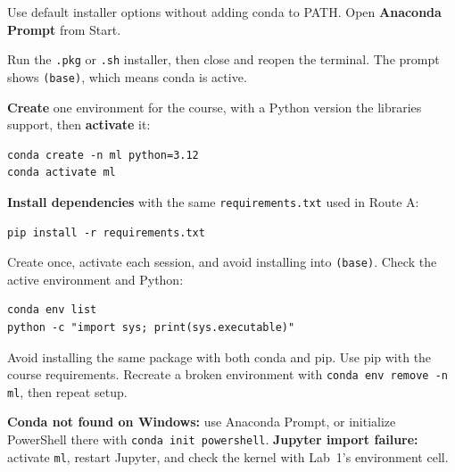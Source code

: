\begin{description}[leftmargin=1.15in,style=nextline]
  \item[Windows] Use default installer options without adding conda to PATH. Open \textbf{Anaconda Prompt} from Start.
  \item[macOS / Linux] Run the \texttt{.pkg} or \texttt{.sh} installer, then close and reopen the terminal. The prompt shows \texttt{(base)}, which means conda is active.
\end{description}

\textbf{Create} one environment for the course, with a Python version the libraries support, then \textbf{activate} it:

\begin{lstlisting}[style=mlterminal]
conda create -n ml python=3.12
conda activate ml
\end{lstlisting}

\textbf{Install dependencies} with the same \texttt{requirements.txt} used in Route A:

\begin{lstlisting}[style=mlterminal]
pip install -r requirements.txt
\end{lstlisting}

Create once, activate each session, and avoid installing into \texttt{(base)}. Check the active environment and Python:

\begin{lstlisting}[style=mlterminal]
conda env list
python -c "import sys; print(sys.executable)"
\end{lstlisting}

\begin{pitfall}
Avoid installing the same package with both conda and pip. Use pip with the course requirements. Recreate a broken environment with \texttt{conda env remove -n ml}, then repeat setup.
\end{pitfall}

\begin{troubleshoot}
\textbf{Conda not found on Windows:} use Anaconda Prompt, or initialize PowerShell there with \texttt{conda init powershell}. \textbf{Jupyter import failure:} activate \texttt{ml}, restart Jupyter, and check the kernel with Lab~1's environment cell.
\end{troubleshoot}
